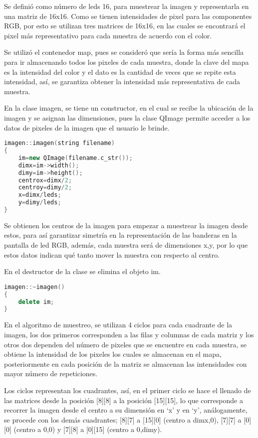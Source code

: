 \documentclass{article}
\begin{document}
Se definió como número de leds 16, para muestrear la imagen y representarla en una matriz de 16x16. Como se tienen intensidades de pixel para las componentes RGB, por esto se utilizan tres matrices de 16x16, en las cuales se encontrará el pixel más representativo para cada muestra de acuerdo con el color.

Se utilizó el contenedor map, pues se consideró que sería la forma más sencilla para ir almacenando todos los pixeles de cada muestra, donde la clave del mapa es la intensidad del color y el dato es la cantidad de veces que se repite esta intensidad, así, se garantiza obtener la intensidad más representativa de cada muestra.

En la clase imagen, se tiene un constructor, en el cual se recibe la ubicación de la imagen y se asignan las dimensiones, pues la clase QImage permite acceder a los datos de pixeles de la imagen que el usuario le brinde.

\begin{lstlisting}[language=C++, label=Constructor]
imagen::imagen(string filename)
{
    im=new QImage(filename.c_str());
    dimx=im->width();
    dimy=im->height();
    centrox=dimx/2;
    centroy=dimy/2;
    x=dimx/leds;
    y=dimy/leds;
}
\end{lstlisting}

Se obtienen los centros de la imagen para empezar a muestrear la imagen desde estos, para así garantizar simetría en la representación de las banderas en la pantalla de led RGB, además, cada muestra será de dimensiones x,y, por lo que estos datos indican qué tanto mover la muestra con respecto al centro.

En el destructor de la clase se elimina el objeto im.

\begin{lstlisting}[language=C++, label=Destructor]
imagen::~imagen()
{
    delete im;
}

\end{lstlisting}

En el algoritmo de muestreo, se utilizan 4 ciclos para cada cuadrante de la imagen, los dos primeros corresponden a las filas y columnas de cada matriz y los otros dos dependen del número de pixeles que se encuentre en cada muestra, se obtiene la intensidad de los pixeles los cuales se almacenan en el mapa, posteriormente en cada posición de la matriz se almacenan las intensidades con mayor número de repeticiones. 

Los ciclos representan los cuadrantes, así, en el primer ciclo se hace el llenado de las matrices desde la posición [8][8] a la posición [15][15], lo que corresponde a recorrer la imagen desde el centro a su dimensión en ‘x’ y en ‘y’, análogamente, se procede con los demás cuadrantes; [8][7] a [15][0] (centro a dimx,0), [7][7] a [0][0] (centro a 0,0) y [7][8] a [0][15] (centro a 0,dimy).
\end{document}
